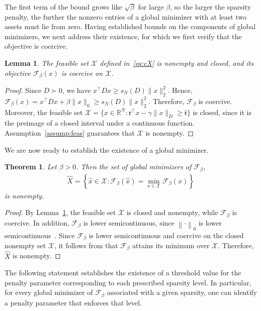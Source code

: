 \documentclass[11pt]{article}
\theoremstyle{plain}
\newtheorem{theorem}{Theorem}
\newtheorem{lemma}{Lemma}
\theoremstyle{definition}
\theoremstyle{plain}
\newcommand{\norm}[1]{\left\lVert#1\right\rVert}
\newcommand{\cF}{{\mathcal F}}
\newcommand{\ccr}{{\mathfrak r}}
\newcommand{\cX}{{\mathcal X}}
\begin{document}
The first term of the bound grows like $\sqrt{\beta}$ for large $\beta$, so the larger the sparsity penalty, the further the nonzero entries of a global minimizer with at least two assets must lie from zero. Having established bounds on the components of global minimizers, we next address their existence, for which we first verify that the objective is coercive.
\begin{lemma}\label{lem:coer}
    The feasible set $\cX$ defined in~\eqref{eq:cX}  is nonempty and closed, and its objective $\cF_\beta(x)$ is coercive on  $\cX$.
\end{lemma}
\begin{proof}
    Since $D \succ 0$, we have
        $x^\top D x \ge s_N(D)\|x\|_2^2$. Hence, $\cF_\beta(x)
        =
        x^\top D x + \beta \|x\|_0
        \ge
        s_N(D)\|x\|_2^2$.
    Therefore, $\cF_\beta$ is coercive. Moreover, the feasible set $\cX
        =
        \{
        x \in \mathbb{R}^N :
        \ccr^\top x - \gamma \|x\|_D \ge \bar \ccr
        \}$ is closed, since it is the preimage of a closed interval under a continuous function. Assumption~\ref{assump:feas} guarantees that $\cX$ is nonempty.

       \end{proof}
We are now ready to establish the existence of a global minimizer.
\begin{theorem}
    Let $\beta>0$. Then the set of global minimizers of $\cF_\beta$,
    \begin{align*}
        \hat{X}
        =
        \left\{
        \hat{x}\in\cX :
        \cF_\beta(\hat{x})
        =
        \min_{x\in\cX}\cF_\beta(x)
        \right\}
    \end{align*}
    is nonempty.
\end{theorem}
\begin{proof}
        By Lemma~\ref{lem:coer}, the feasible set $\cX$ is closed and nonempty, while $\cF_\beta$ is coercive. In addition, $\cF_\beta$ is lower semicontinuous, since $\norm{\cdot}_0$ is lower semicontinuous~\cite[Proof of Proposition 4.3]{Nikolova2013}. Since $\cF_\beta$ is lower semicontinuous and coercive on the closed nonempty set $\cX$, it follows from \cite[Theorem~1.9]{rockafellar1998} that $\cF_\beta$ attains its minimum over $\cX$. Therefore, $\hat{X}$ is nonempty.
\end{proof}
The following statement establishes the existence of a threshold value for the penalty parameter corresponding to each prescribed sparsity level. In particular, for every global minimizer of $\cF_\beta$ associated with a given sparsity, one can identify a penalty parameter that enforces that level.
\end{document}

